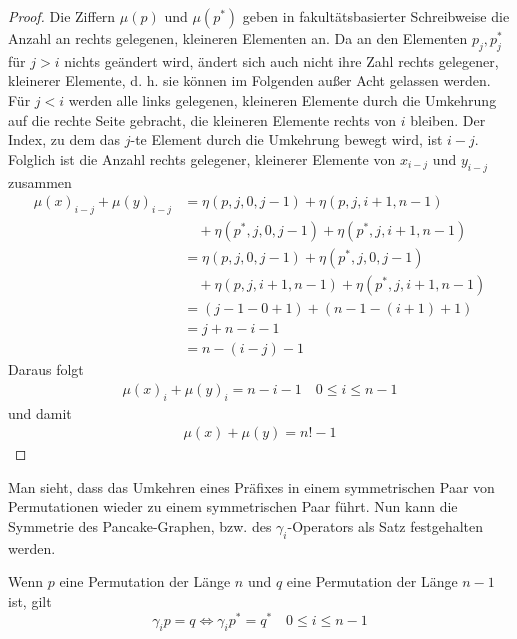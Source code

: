 \documentclass[a4paper, 11pt, ngerman]{article}
\begin{document}
\begin{proof}
    Die Ziffern $\mu(p)$ und $\mu(p^*)$ geben in fakultätsbasierter Schreibweise die Anzahl an rechts gelegenen, kleineren Elementen an. Da an den Elementen $p_j, p^*_j$ für $j > i$ nichts geändert wird, ändert sich auch nicht ihre Zahl rechts gelegener, kleinerer Elemente, d. h. sie können im Folgenden außer Acht gelassen werden. Für $j < i$ werden alle links gelegenen, kleineren Elemente durch die Umkehrung auf die rechte Seite gebracht, die kleineren Elemente rechts von $i$ bleiben. Der Index, zu dem das $j$-te Element durch die Umkehrung bewegt wird, ist $i - j$. Folglich ist die Anzahl rechts gelegener, kleinerer Elemente von $x_{i - j}$ und $y_{i - j}$ zusammen
    \begin{align*}
        \mu(x)_{i - j} + \mu(y)_{i - j}
         & =  \eta(p, j, 0, j - 1) + \eta(p, j, i + 1, n - 1)            \\
         & \quad + \eta(p^*, j, 0, j - 1) + \eta(p^*, j, i + 1, n - 1)   \\
         & =  \eta(p, j, 0, j - 1) + \eta(p^*, j, 0, j - 1)              \\
         & \quad + \eta(p, j, i + 1, n - 1) + \eta(p^*, j, i + 1, n - 1) \\
         & =  (j - 1 - 0 + 1) + (n - 1 - (i + 1) + 1)                    \\
         & =  j + n - i - 1                                              \\
         & =  n - (i - j) - 1
    \end{align*}
    Daraus folgt
    \begin{align*}
        \mu(x)_i + \mu(y)_i = n - i - 1 \quad 0 \le i \le n - 1
    \end{align*}
    und damit
    \begin{align*}
        \mu(x) + \mu(y) = n! - 1
    \end{align*}
\end{proof}

Man sieht, dass das Umkehren eines Präfixes in einem symmetrischen Paar von Permutationen wieder zu einem symmetrischen Paar führt. Nun kann die Symmetrie des Pancake-Graphen, bzw. des $\gamma_i$-Operators als Satz festgehalten werden.

\begin{theorem}
    Wenn $p$ eine Permutation der Länge $n$ und $q$ eine Permutation der Länge $n - 1$ ist, gilt
    $$
        \gamma_i p = q \Longleftrightarrow \gamma_i p^* = q^* \quad 0 \le i \le n - 1
    $$
\end{theorem}
\end{document}
